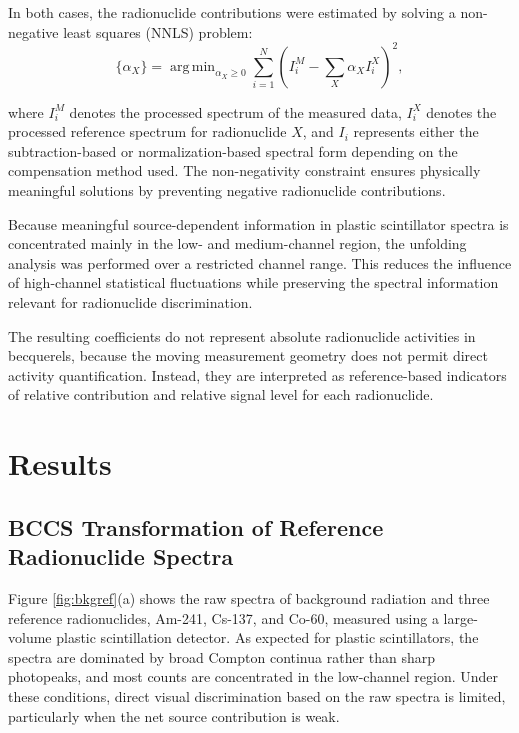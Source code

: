 \documentclass[fleqn, 10pt]{wlscirep}
\DeclareMathOperator*{\argmin}{arg\,min} %
\begin{document}
In both cases, the radionuclide contributions were estimated by solving a non-negative least squares (NNLS) problem:
\begin{equation}
\{\alpha_X\}
=
\argmin_{\alpha_X \ge 0}
\sum_{i=1}^{N}
\left(
I_i^{M} - \sum_{X}\alpha_X I_i^{X}
\right)^2,
\label{eqn:nnls}
\end{equation}

\noindent where $I_i^{M}$ denotes the processed spectrum of the measured data, $I_i^{X}$ denotes the processed reference spectrum for radionuclide $X$, and $I_i$ represents either the subtraction-based or normalization-based spectral form depending on the compensation method used. The non-negativity constraint ensures physically meaningful solutions by preventing negative radionuclide contributions.

Because meaningful source-dependent information in plastic scintillator spectra is concentrated mainly in the low- and medium-channel region, the unfolding analysis was performed over a restricted channel range. This reduces the influence of high-channel statistical fluctuations while preserving the spectral information relevant for radionuclide discrimination.

The resulting coefficients do not represent absolute radionuclide activities in becquerels, because the moving measurement geometry does not permit direct activity quantification. Instead, they are interpreted as reference-based indicators of relative contribution and relative signal level for each radionuclide.



\section*{Results}


\subsection*{BCCS Transformation of Reference Radionuclide Spectra}

Figure \ref{fig:bkgref}(a) shows the raw spectra of background radiation and three reference radionuclides, Am-241, Cs-137, and Co-60, measured using a large-volume plastic scintillation detector. As expected for plastic scintillators, the spectra are dominated by broad Compton continua rather than sharp photopeaks, and most counts are concentrated in the low-channel region. Under these conditions, direct visual discrimination based on the raw spectra is limited, particularly when the net source contribution is weak.
\end{document}

